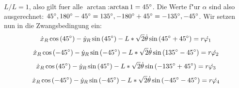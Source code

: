 \documentclass[11pt]{article}
\begin{document}
    $L/L = 1$, also gilt fuer alle $\arctan$:\space$\arctan1 = 45\degree$.
    Die Werte f"ur $\alpha$ sind also ausgerechnet: $45\degree, 180\degree-45\degree = 135\degree, -180\degree+45 \degree = -135\degree, -45\degree$.
    Wir setzen nun in die Zwangsbedingung ein:
    \begin{equation}
        \dot{x}_{R}\cos\left(45\degree \right) - \dot{y}_{R}\sin\left(45\degree \right) - L*\sqrt{2}\dot{\theta}\sin\left( 45\degree + 45\degree \right) = r\dot{\varphi_{1}}\label{eq:einsetzen1}
    \end{equation}
    \begin{equation}
        \dot{x}_{R}\cos\left(-45\degree \right) - \dot{y}_{R}\sin\left(-45\degree \right) - L*\sqrt{2}\dot{\theta}\sin\left( 135\degree -45\degree \right) = r\dot{\varphi_{2}}\label{eq:einsetzen2}
    \end{equation}
    \begin{equation}
        \dot{x}_{R}\cos\left(45\degree \right) - \dot{y}_{R}\sin\left(45\degree \right) - L*\sqrt{2}\dot{\theta}\sin\left( -135\degree + 45\degree \right) = r\dot{\varphi_{3}}\label{eq:einsetzen3}
    \end{equation}
    \begin{equation}
        \dot{x}_{R}\cos\left(-45\degree \right) - \dot{y}_{R}\sin\left(-45\degree \right) - L*\sqrt{2}\dot{\theta}\sin\left( -45\degree - 45\degree \right) = r\dot{\varphi_{4}}\label{eq:einsetzen4}
    \end{equation}
\end{document}

